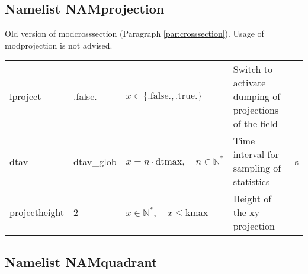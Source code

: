 \documentclass[twoside,11pt,fleqn,a4paper,english,openright]{report}
\begin{document}
\subsection{Namelist NAMprojection}\label{par:projection}
Old version of modcrosssection (Paragraph \ref{par:crosssection}). Usage of modprojection is not advised.
\begin{center}
  \tablelasttail{
        &&&&\\\hline
  }
\begin{supertabular}{|l|p{1.6cm}|p{4cm}|p{6cm}|l|}
  lproject	&	.false.	& $x\in\{\text{.false.},\text{.true.}\}$	& Switch to activate dumping of projections of the field	& -\\
  dtav		& dtav\_glob	& $x = n \cdot \text{dtmax}, \quad n \in \mathbb{N}^*$	& Time interval for sampling of statistics	& s\\
  projectheight	& 2	& $x \in \mathbb{N}^*, \quad x \le \text{kmax}$	& Height of the xy-projection & -\\
\end{supertabular}
\end{center}

\subsection{Namelist NAMquadrant}\label{par:quadrant}
\end{document}
